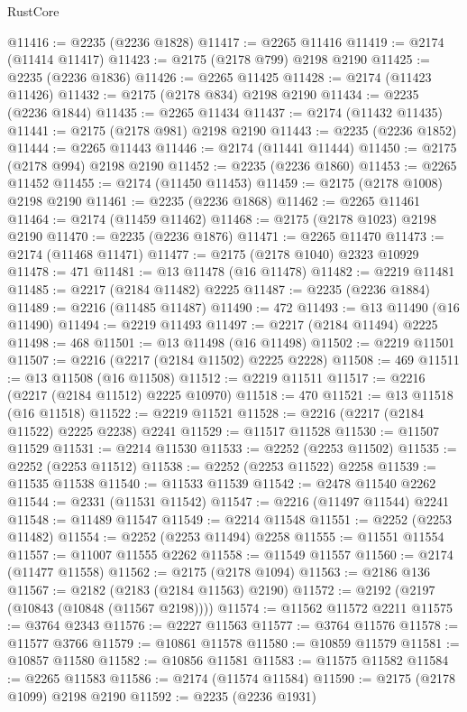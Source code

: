 \begin{lexlean}{RustCore}
\begin{coremodule}
@11416 := @2235 (@2236 @1828)
@11417 := @2265 @11416
@11419 := @2174 (@11414 @11417)
@11423 := @2175 (@2178 @799) @2198 @2190
@11425 := @2235 (@2236 @1836)
@11426 := @2265 @11425
@11428 := @2174 (@11423 @11426)
@11432 := @2175 (@2178 @834) @2198 @2190
@11434 := @2235 (@2236 @1844)
@11435 := @2265 @11434
@11437 := @2174 (@11432 @11435)
@11441 := @2175 (@2178 @981) @2198 @2190
@11443 := @2235 (@2236 @1852)
@11444 := @2265 @11443
@11446 := @2174 (@11441 @11444)
@11450 := @2175 (@2178 @994) @2198 @2190
@11452 := @2235 (@2236 @1860)
@11453 := @2265 @11452
@11455 := @2174 (@11450 @11453)
@11459 := @2175 (@2178 @1008) @2198 @2190
@11461 := @2235 (@2236 @1868)
@11462 := @2265 @11461
@11464 := @2174 (@11459 @11462)
@11468 := @2175 (@2178 @1023) @2198 @2190
@11470 := @2235 (@2236 @1876)
@11471 := @2265 @11470
@11473 := @2174 (@11468 @11471)
@11477 := @2175 (@2178 @1040) @2323 @10929
@11478 := 471
@11481 := @13 @11478 (@16 @11478)
@11482 := @2219 @11481
@11485 := @2217 (@2184 @11482) @2225
@11487 := @2235 (@2236 @1884)
@11489 := @2216 (@11485 @11487)
@11490 := 472
@11493 := @13 @11490 (@16 @11490)
@11494 := @2219 @11493
@11497 := @2217 (@2184 @11494) @2225
@11498 := 468
@11501 := @13 @11498 (@16 @11498)
@11502 := @2219 @11501
@11507 := @2216 (@2217 (@2184 @11502) @2225 @2228)
@11508 := 469
@11511 := @13 @11508 (@16 @11508)
@11512 := @2219 @11511
@11517 := @2216 (@2217 (@2184 @11512) @2225 @10970)
@11518 := 470
@11521 := @13 @11518 (@16 @11518)
@11522 := @2219 @11521
@11528 := @2216 (@2217 (@2184 @11522) @2225 @2238) @2241
@11529 := @11517 @11528
@11530 := @11507 @11529
@11531 := @2214 @11530
@11533 := @2252 (@2253 @11502)
@11535 := @2252 (@2253 @11512)
@11538 := @2252 (@2253 @11522) @2258
@11539 := @11535 @11538
@11540 := @11533 @11539
@11542 := @2478 @11540 @2262
@11544 := @2331 (@11531 @11542)
@11547 := @2216 (@11497 @11544) @2241
@11548 := @11489 @11547
@11549 := @2214 @11548
@11551 := @2252 (@2253 @11482)
@11554 := @2252 (@2253 @11494) @2258
@11555 := @11551 @11554
@11557 := @11007 @11555 @2262
@11558 := @11549 @11557
@11560 := @2174 (@11477 @11558)
@11562 := @2175 (@2178 @1094)
@11563 := @2186 @136
@11567 := @2182 (@2183 (@2184 @11563) @2190)
@11572 := @2192 (@2197 (@10843 (@10848 (@11567 @2198))))
@11574 := @11562 @11572 @2211
@11575 := @3764 @2343
@11576 := @2227 @11563
@11577 := @3764 @11576
@11578 := @11577 @3766
@11579 := @10861 @11578
@11580 := @10859 @11579
@11581 := @10857 @11580
@11582 := @10856 @11581
@11583 := @11575 @11582
@11584 := @2265 @11583
@11586 := @2174 (@11574 @11584)
@11590 := @2175 (@2178 @1099) @2198 @2190
@11592 := @2235 (@2236 @1931)

\end{coremodule}
\end{lexlean}
